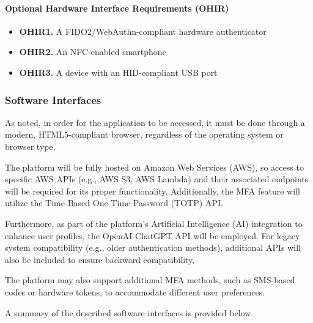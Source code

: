 \paragraph{Optional Hardware Interface Requirements (OHIR)}
\begin{itemize}
    \item \textbf{OHIR1.} A FIDO2/WebAuthn-compliant hardware authenticator
    \item \textbf{OHIR2.} An NFC-enabled smartphone
    \item \textbf{OHIR3.} A device with an HID-compliant USB port
\end{itemize}


\subsubsection{Software Interfaces}

As noted, in order for the application to be accessed, it must be done through a modern, HTML5-compliant browser, regardless of the operating system or browser type. 

The platform will be fully hosted on Amazon Web Services (AWS), so access to specific AWS APIs (e.g., AWS S3, AWS Lambda) and their associated endpoints will be required for its proper functionality. Additionally, the MFA feature will utilize the Time-Based One-Time Password (TOTP) API.

Furthermore, as part of the platform's Artificial Intelligence (AI) integration to enhance user profiles, the OpenAI ChatGPT API will be employed. For legacy system compatibility (e.g., older authentication methods), additional APIs will also be included to ensure backward compatibility.

The platform may also support additional MFA methods, such as SMS-based codes or hardware tokens, to accommodate different user preferences.

A summary of the described software interfaces is provided below.


